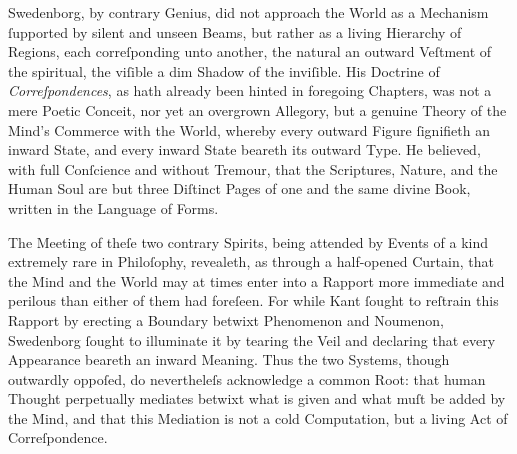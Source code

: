 \documentclass[12pt]{book}
\begin{document}
\vspace{1em}

\noindent
Swedenborg, by contrary Genius, did not approach the World as a Mechanism ſupported by silent and unseen Beams, but rather as a living Hierarchy of Regions, each correſponding unto another, the natural an outward Veſtment of the spiritual, the viſible a dim Shadow of the inviſible. His Doctrine of \textit{Correſpondences}, as hath already been hinted in foregoing Chapters, was not a mere Poetic Conceit, nor yet an overgrown Allegory, but a genuine Theory of the Mind’s Commerce with the World, whereby every outward Figure ſignifieth an inward State, and every inward State beareth its outward Type. He believed, with full Conſcience and without Tremour, that the Scriptures, Nature, and the Human Soul are but three Diſtinct Pages of one and the same divine Book, written in the Language of Forms.

\vspace{1em}

\noindent
The Meeting of theſe two contrary Spirits, being attended by Events of a kind extremely rare in Philoſophy, revealeth, as through a half-opened Curtain, that the Mind and the World may at times enter into a Rapport more immediate and perilous than either of them had foreſeen. For while Kant ſought to reſtrain this Rapport by erecting a Boundary betwixt Phenomenon and Noumenon, Swedenborg ſought to illuminate it by tearing the Veil and declaring that every Appearance beareth an inward Meaning. Thus the two Systems, though outwardly oppoſed, do nevertheleſs acknowledge a common Root: that human Thought perpetually mediates betwixt what is given and what muſt be added by the Mind, and that this Mediation is not a cold Computation, but a living Act of Correſpondence.

\vspace{1em}
\end{document}

